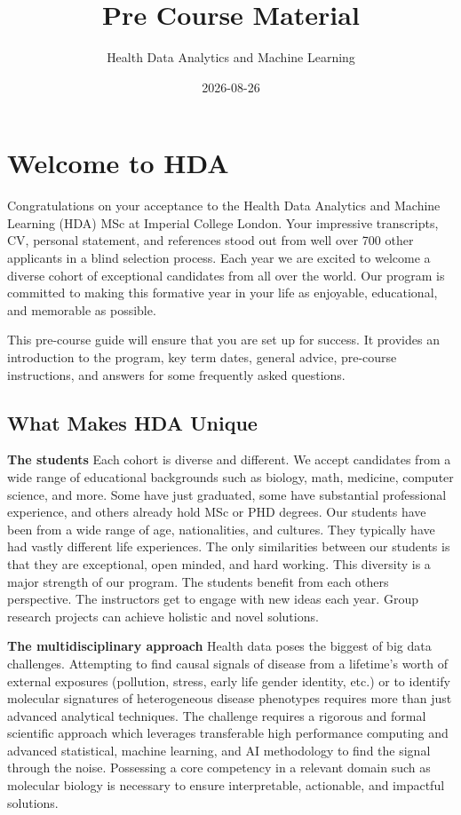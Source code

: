 \documentclass[
]{book}
\title{Pre Course Material}
\author{Health Data Analytics and Machine Learning}
\date{2026-08-26}
\begin{document}
\maketitle

{
\setcounter{tocdepth}{1}
\tableofcontents
}
\chapter*{Welcome to HDA}\label{welcome-to-hda}

Congratulations on your acceptance to the Health Data Analytics and Machine Learning (HDA) MSc at Imperial College London. Your impressive transcripts, CV, personal statement, and references stood out from well over 700 other applicants in a blind selection process. Each year we are excited to welcome a diverse cohort of exceptional candidates from all over the world. Our program is committed to making this formative year in your life as enjoyable, educational, and memorable as possible.

This pre-course guide will ensure that you are set up for success. It provides an introduction to the program, key term dates, general advice, pre-course instructions, and answers for some frequently asked questions.

\section*{What Makes HDA Unique}\label{what-makes-hda-unique}

\textbf{The students} Each cohort is diverse and different. We accept candidates from a wide range of educational backgrounds such as biology, math, medicine, computer science, and more. Some have just graduated, some have substantial professional experience, and others already hold MSc or PHD degrees. Our students have been from a wide range of age, nationalities, and cultures. They typically have had vastly different life experiences. The only similarities between our students is that they are exceptional, open minded, and hard working. This diversity is a major strength of our program. The students benefit from each others perspective. The instructors get to engage with new ideas each year. Group research projects can achieve holistic and novel solutions.

\textbf{The multidisciplinary approach} Health data poses the biggest of big data challenges. Attempting to find causal signals of disease from a lifetime's worth of external exposures (pollution, stress, early life gender identity, etc.) or to identify molecular signatures of heterogeneous disease phenotypes requires more than just advanced analytical techniques. The challenge requires a rigorous and formal scientific approach which leverages transferable high performance computing and advanced statistical, machine learning, and AI methodology to find the signal through the noise. Possessing a core competency in a relevant domain such as molecular biology is necessary to ensure interpretable, actionable, and impactful solutions.
\end{document}

